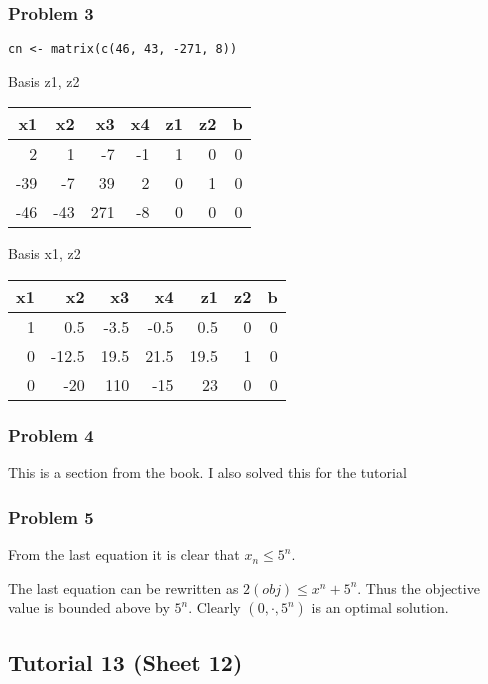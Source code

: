 \documentclass[11pt]{article}
\begin{document}
\subsubsection{Problem 3}
\label{sec:org99a77e5}
\begin{verbatim}
cn <- matrix(c(46, 43, -271, 8))
\end{verbatim}

Basis z1, z2
\begin{center}
\begin{tabular}{rrrrrrr}
x1 & x2 & x3 & x4 & z1 & z2 & b\\
\hline
2 & 1 & -7 & -1 & 1 & 0 & 0\\
-39 & -7 & 39 & 2 & 0 & 1 & 0\\
\hline
-46 & -43 & 271 & -8 & 0 & 0 & 0\\
\end{tabular}
\end{center}

Basis x1, z2
\begin{center}
\begin{tabular}{rrrrrrr}
x1 & x2 & x3 & x4 & z1 & z2 & b\\
\hline
1 & 0.5 & -3.5 & -0.5 & 0.5 & 0 & 0\\
0 & -12.5 & 19.5 & 21.5 & 19.5 & 1 & 0\\
0 & -20 & 110 & -15 & 23 & 0 & 0\\
\end{tabular}
\end{center}



\subsubsection{Problem 4}
\label{sec:org6525b05}
This is a section from the book. I also solved this for the tutorial
\subsubsection{Problem 5}
\label{sec:org25567b5}
From the last equation it is clear that \(x_n \le 5^n\). 

The last equation can be rewritten as \(2(obj) \le x^n + 5^n\). Thus the
objective value is bounded above by \(5^n\). Clearly \((0, \cdot, 5^n)\) is an
optimal solution.
\subsection{Tutorial 13 (Sheet 12)}
\label{sec:org82b433c}
\end{document}
